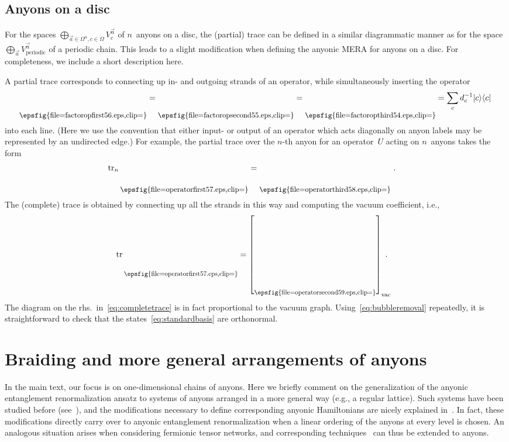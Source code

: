 \documentclass[floats,prb,twocolumn]{revtex4}
\newcommand*{\tr}{\mathop{\mathrm{tr}}\nolimits}
\newcommand{\proj}[1]{|#1\rangle\langle#1|}
\newcommand*{\factoropthird}{\raisebox{-23.283pt}{\epsfig{file=factoropthird54.eps,clip=}}}
\newcommand*{\factoropsecond}{\raisebox{-23.283pt}{\epsfig{file=factoropsecond55.eps,clip=}}}
\newcommand*{\factoropfirst}{\raisebox{-23.283pt}{\epsfig{file=factoropfirst56.eps,clip=}}}
\newcommand*{\operatorfirst}{\raisebox{-28.926pt}{\epsfig{file=operatorfirst57.eps,clip=}}}
\newcommand*{\operatorthird}{\raisebox{-28.926pt}{\epsfig{file=operatorthird58.eps,clip=}}}
\newcommand*{\operatorsecond}{\raisebox{-57.303pt}{\epsfig{file=operatorsecond59.eps,clip=}}}
\begin{document}
\vspace{4ex}

\subsection{Anyons on a disc\label{app:disctrace}}
For the spaces $\bigoplus_{\vec{a}\in\Omega^n, c\in\Omega}V^{\vec{a}}_c$ of $n$~anyons on a disc, the (partial) trace  can be defined in a similar diagrammatic manner as for the space~$\bigoplus_{\vec{a}} V^{\vec{a}}_{\textrm{periodic}}$ of a periodic chain. This leads to a slight modification when defining the anyonic MERA for anyons on a disc.  For completeness, we include a short description here. 

A partial trace corresponds to connecting up in- and outgoing strands of an operator, while  simultaneously inserting the operator 
\begin{align}
\scalebox{0.9}{\factoropfirst}=\scalebox{0.9}{\factoropsecond}=\scalebox{0.9}{\factoropthird}=\sum_c d^{-1}_c \proj{c}\ \label{eq:aperiodiccorrection}
\end{align}
into each line.  (Here we use the convention that 
either input- or output  of an operator which acts diagonally on anyon labels  may be represented by an undirected edge.) For example, the partial  trace over  the $n$-th anyon for an operator~$U$ acting on $n$~anyons takes the form
\begin{align*}
\tr_{n}\scalebox{0.9}{\operatorfirst} &= \scalebox{0.9}{\operatorthird}\ .
\end{align*} 
The (complete) trace is obtained by connecting up all the strands in this way and computing the vacuum coefficient, i.e., 
\begin{align}
\tr\scalebox{0.8}{\operatorfirst} &= \left[\scalebox{0.8}{\operatorsecond}\right]_{\textrm{vac}}\hspace{-2ex}. \label{eq:completetrace} 
\end{align}
The diagram on the rhs.~in~\eqref{eq:completetrace} is in fact proportional to the vacuum graph. Using~\eqref{eq:bubbleremoval} repeatedly, it is straightforward to check that the states~\eqref{eq:standardbasis} are orthonormal.
 
\section{Braiding and more general  arrangements of anyons\label{app:braidingetc}\label{app:twodmerageneralization}}
In the main text, our focus is on one-dimensional chains of anyons. Here we briefly comment on the generalization of the anyonic entanglement renormalization ansatz to systems of anyons arranged in a more general way (e.g., a regular lattice). Such systems have been studied before (see~\cite{LudwPoil10}), and the  modifications necessary to define corresponding anyonic Hamiltonians are nicely explained in~\cite{Trebstetal08}. In fact, these modifications directly carry over to anyonic entanglement renormalization when a linear ordering of the anyons  at every level is chosen. An analogous situation arises when considering fermionic tensor networks, and corresponding techniques~\cite{Bartheletal09,Pinedaetal10} can thus be extended to anyons. 
\end{document}
